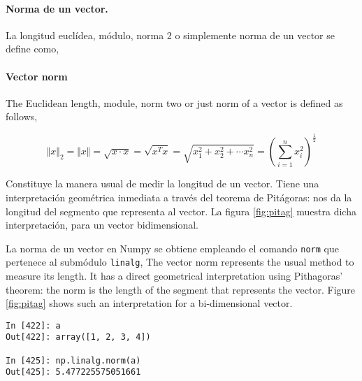 \begin{paracol}{2}
\paragraph{Norma de un vector.} La longitud euclídea, módulo,  norma 2 o simplemente norma  de un vector se define como,
\switchcolumn
\paragraph{Vector norm} The Euclidean length, module, norm two or just norm of a vector is defined as follows,
\end{paracol}
\begin{equation*}
\Vert x \Vert_2 =\Vert x \Vert =\sqrt{x\cdot x}=\sqrt{x^Tx}=\sqrt{x_1^2+x_2^2+\cdots x_n^2}=\left( \sum_{i=1}^nx_i^2 \right)^\frac{1}{2}
\end{equation*}
\begin{paracol}{2}
Constituye la manera usual de medir la longitud de un vector. Tiene una interpretación geométrica inmediata a través del teorema de Pitágoras: nos da la longitud del segmento que representa al vector. La figura \ref{fig:pitag} muestra dicha interpretación, para un vector bidimensional.

La norma de un vector en Numpy se obtiene empleando el  comando \texttt{norm} que pertenece al submódulo \texttt{linalg},
\switchcolumn
The vector norm represents the usual method to measure its length. It has a direct geometrical interpretation using Pithagoras' theorem: the norm is the length of the segment that represents the vector. Figure \ref{fig:pitag} shows such an interpretation for a bi-dimensional vector.
\end{paracol}
\begin{center}
    \begin{minipage}{0.3\textwidth}
        \begin{verbatim}
In [422]: a
Out[422]: array([1, 2, 3, 4])

In [425]: np.linalg.norm(a)
Out[425]: 5.477225575051661
\end{verbatim}
\end{minipage}
\end{center}

